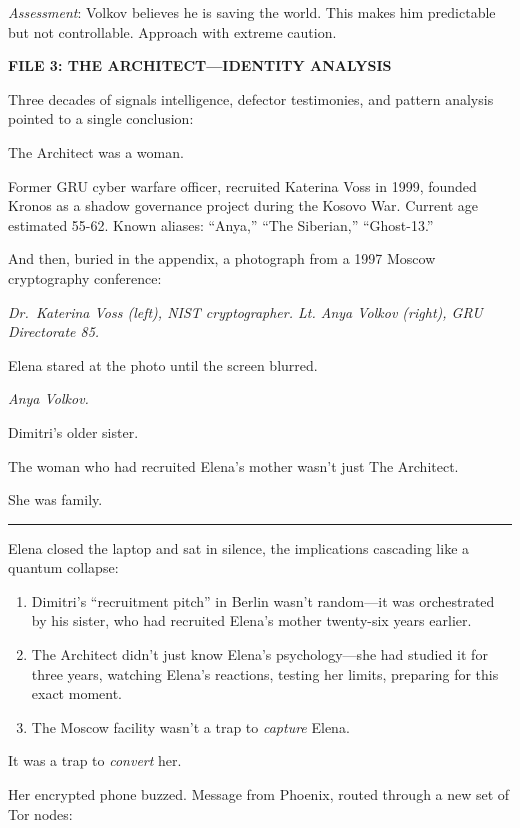 \emph{Assessment}: Volkov believes he is saving the world. This makes him predictable but not controllable. Approach with extreme caution.

\textbf{FILE 3: THE ARCHITECT---IDENTITY ANALYSIS}

Three decades of signals intelligence, defector testimonies, and pattern analysis pointed to a single conclusion:

The Architect was a woman.

Former GRU cyber warfare officer, recruited Katerina Voss in 1999, founded Kronos as a shadow governance project during the Kosovo War. Current age estimated 55-62. Known aliases: ``Anya,'' ``The Siberian,'' ``Ghost-13.''

And then, buried in the appendix, a photograph from a 1997 Moscow cryptography conference:

\emph{Dr.~Katerina Voss (left), NIST cryptographer. Lt. Anya Volkov (right), GRU Directorate 85.}

Elena stared at the photo until the screen blurred.

\emph{Anya Volkov.}

Dimitri's older sister.

The woman who had recruited Elena's mother wasn't just The Architect.

She was family.

\begin{center}\rule{0.5\linewidth}{0.5pt}\end{center}

Elena closed the laptop and sat in silence, the implications cascading like a quantum collapse:

\begin{enumerate}
\def\labelenumi{\arabic{enumi}.}
\item
  Dimitri's ``recruitment pitch'' in Berlin wasn't random---it was orchestrated by his sister, who had recruited Elena's mother twenty-six years earlier.
\item
  The Architect didn't just know Elena's psychology---she had studied it for three years, watching Elena's reactions, testing her limits, preparing for this exact moment.
\item
  The Moscow facility wasn't a trap to \emph{capture} Elena.
\end{enumerate}

It was a trap to \emph{convert} her.

Her encrypted phone buzzed. Message from Phoenix, routed through a new set of Tor nodes:


